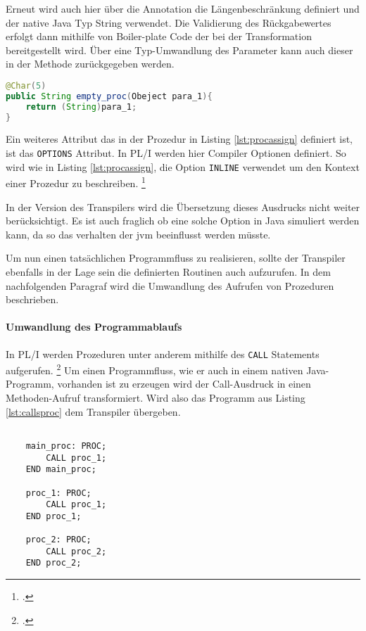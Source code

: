 Erneut wird auch hier über die Annotation die Längenbeschränkung definiert und der native Java Typ String verwendet.
Die Validierung des Rückgabewertes erfolgt dann mithilfe von Boiler-plate Code der bei der Transformation bereitgestellt wird.
Über eine Typ-Umwandlung des Parameter kann auch dieser in der Methode zurückgegeben werden. 

\begin{lstlisting}[language=Java, caption=\"Ubersetzung der Prozedur, label={lst:metassign}]
@Char(5)
public String empty_proc(Obeject para_1){
	return (String)para_1;
}
\end{lstlisting} 

Ein weiteres Attribut das in der Prozedur in Listing \ref{lst:procassign} definiert ist, ist das \verb+OPTIONS+
Attribut.
In PL/I werden hier Compiler Optionen definiert. So wird wie in Listing \ref{lst:procassign}, die Option \verb+INLINE+ verwendet um den Kontext einer Prozedur zu beschreiben. \footcite[Vgl. ][]{optionsstmt}

In der Version des Transpilers wird die Übersetzung dieses Ausdrucks nicht weiter berücksichtigt.
Es ist auch fraglich ob eine solche Option in Java simuliert werden kann, da so das verhalten der \ac{jvm} beeinflusst werden müsste.

Um nun einen tatsächlichen Programmfluss zu realisieren, sollte der Transpiler ebenfalls in der Lage sein die definierten Routinen auch aufzurufen.
In dem nachfolgenden Paragraf wird die Umwandlung des Aufrufen von Prozeduren beschrieben.

\paragraph{Umwandlung des Programmablaufs}

In PL/I werden Prozeduren unter anderem mithilfe des \verb+CALL+ Statements aufgerufen. \footcite[Vgl. ][S.133ff. ]{pliref} Um einen Programmfluss, wie er auch in einem nativen Java-Programm, vorhanden ist zu erzeugen wird der Call-Ausdruck in einen Methoden-Aufruf transformiert. Wird also das Programm aus Listing \ref{lst:callsproc} dem Transpiler übergeben.

\begin{lstlisting}[language=PL/I, caption=\"Ubersetzung der Prozedur, label={lst:callsproc}]

	main_proc: PROC;
		CALL proc_1;
	END main_proc;

	proc_1: PROC;
		CALL proc_1;
	END proc_1;

	proc_2: PROC;
		CALL proc_2;
	END proc_2;

\end{lstlisting} 

